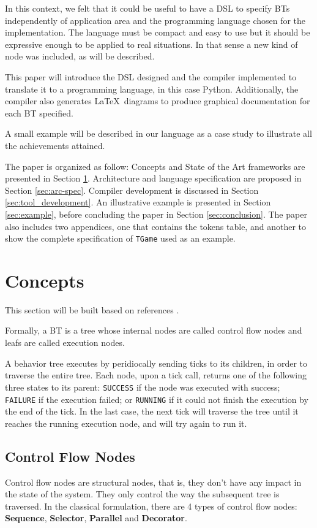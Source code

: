 \documentclass[a4paper,UKenglish,cleveref, autoref, thm-restate]{oasics-v2019}
\begin{document}
In this context, we felt that it could be useful to have a DSL to specify BTs independently of application area and the programming language chosen for the implementation.
The language must be compact and easy to use but it should be expressive enough to be applied to real situations.
In that sense a new kind of node was included, as will be described.

This paper will introduce the DSL designed and the compiler implemented to translate it to a programming language, in this case Python.
Additionally, the compiler also generates \LaTeX\ diagrams to produce graphical documentation for each BT specified.

A small example will be described in our language as a case study to illustrate all the achievements attained.

The paper is organized as follow: Concepts and State of the Art frameworks are presented in Section \ref{sec:concepts}.
Architecture and language specification are proposed in Section \ref{sec:arc-spec}.
Compiler development is discussed in Section \ref{sec:tool_development}.
An illustrative example is presented in Section \ref{sec:example}, 
before concluding the paper in Section \ref{sec:conclusion}.
The paper also includes two appendices, one that contains the tokens table,
 and another to show the complete specification of \texttt{TGame} used as an example.

\section{Concepts}
\label{sec:concepts}

This section will be built based on references \cite{ColOgr2018,Simpson2014,MilFunge2009}.

Formally, a BT is a tree whose internal nodes are called control flow nodes and leafs are called execution nodes.

A behavior tree executes by peridiocally sending ticks to its children, in order to traverse the entire tree.
Each node, upon a tick call, returns one of the following three states to its parent: \texttt{SUCCESS} if the node was executed with success; \texttt{FAILURE} if the execution failed; or \texttt{RUNNING} if it could not finish the execution by the end of the tick.
In the last case, the next tick will traverse the tree until it reaches the running execution node, and will try again to run it.

\subsection{Control Flow Nodes}
Control flow nodes are structural nodes, that is, they don't have any impact in the state of the system. They only control the way the subsequent tree is traversed.
In the classical formulation, there are 4 types of control flow nodes: \textbf{Sequence}, \textbf{Selector}, \textbf{Parallel} and \textbf{Decorator}.
\end{document}
